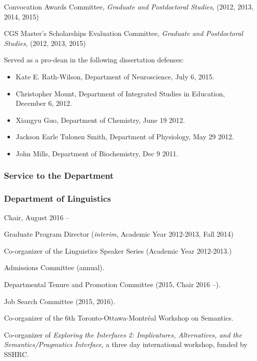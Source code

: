 \documentclass[11pt]{article}
\begin{document}
Convocation Awards Committee, \textit{Graduate and
  Postdoctoral Studies}, (2012, 2013, 2014, 2015)

CGS Master's Scholarships Evaluation Committee, \textit{Graduate and
  Postdoctoral Studies}, (2012, 2013, 2015)

Served as a pro-dean in the following dissertation defenses:

\begin{itemize}
\item Kate E. Rath-Wilson, Department of Neuroscience, July 6, 2015.
\item Christopher Mount, Department of Integrated Studies in
  Education, December 6, 2012.
\item Xiangyu Guo, Department of Chemistry, June 19 2012.
\item Jackson Earle Tulonen Smith, Department of Physiology, May 29 2012.
\item John Mills, Department of Biochemistry, Dec 9 2011.

\end{itemize}

\subsubsection*{Service to the Department}

\subsubsection*{Department of Linguistics}

Chair, August 2016 --

Graduate Program Director (\textit{interim}, Academic Year 2012-2013, Fall 2014)


Co-organizer of the Linguistics Speaker Series (Academic Year 2012-2013.)


Admissions Committee (annual).

Departmental Tenure and Promotion Committee (2015, Chair 2016 --).

Job Search Committee (2015, 2016).

Co-organizer of the 6th Toronto-Ottawa-Montr\'eal Workshop on
Semantics.

Co-organizer of \textit{Exploring the Interfaces 2: Implicatures,
  Alternatives, and the Semantics/Pragmatics Interface}, a three day
international workshop, funded by SSHRC.
\end{document}
